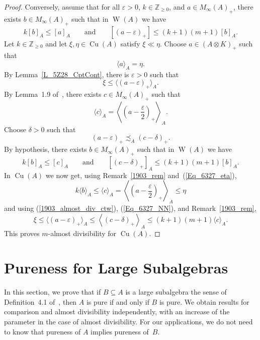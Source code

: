 \documentclass[10pt]{amsart}
\numberwithin{equation}{section}
\theoremstyle{definition}
\newcommand{\ep}{\varepsilon}
\newcommand{\Nz}{{\mathbb{Z}}_{\geq 0}}
\newcommand{\Cu}{{\operatorname{Cu}}}
\newcommand{\W}{{\operatorname{W}}}
\newcommand{\andeqn}{\qquad {\mbox{and}} \qquad}
\newcommand{\ifo}{if and only if}
\renewcommand{\S}{\subseteq}
\newcommand{\cc}[1]{\langle #1 \rangle}
\newcommand{\inn}[1]{\left\langle #1 \right\rangle}
\begin{document}
\begin{proof}
Conversely, assume that for all $\ep > 0$,
$k \in \Nz$, and $a \in M_{\infty}(A)_+$,
there exists $b \in M_{\infty}(A)_+$ such that in $\W (A)$ we have
\[
k[b]_A \leq [a]_A
\andeqn
[(a - \ep)_+] \leq (k + 1) (m + 1) [b]_A.
\]
Let $k \in \Nz$ and let $\xi, \eta \in \Cu (A)$ satisfy $\xi \ll \eta$.
Choose $a \in (A \otimes K)_+$ such that
%
\begin{equation}\label{Eq_6327_eta}
\cc{a}_A = \eta.
\end{equation}
%
By Lemma~\ref{L_5Z28_CptCont}, there is $\ep > 0$ such that
%
\begin{equation}\label{1903_almost_div_ctw}
\xi \leq \cc{(a - \ep)_+}_A.
\end{equation}
%
By Lemma~1.9 of~\cite{Phl40},
there exists $ c\in M_{\infty}(A)_+$ such that
\begin{equation*}
\cc{c}_A = \inn{\left(a - \frac{\ep}{2} \right)_+}_A.
\end{equation*}
Choose $\delta > 0$ such that
%
\begin{equation}\label{Eq_6327_NN}
\left(a - \ep\right)_+ \precsim_A (c- \delta)_+.
\end{equation}
%
By hypothesis, there exists $b \in M_{\infty}(A)_+$ such that
in $\W (A)$ we have
\[
k[b]_A \leq [c]_A
\andeqn
\left[\left(c- \delta\right)_+\right]_A \leq (k + 1) (m + 1) [b]_A.
\]
In $\Cu (A)$ we now get,
using Remark~\ref{1903_rem} and~(\ref{Eq_6327_eta}),
%
\begin{equation*}
k \cc{b}_A \leq \cc{c}_A
 = \inn{\left(a - \frac{\ep}{2} \right)_+}_A \leq \eta
\end{equation*}
%
and using (\ref{1903_almost_div_ctw}), (\ref{Eq_6327_NN}),
and Remark~\ref{1903_rem},
%
\begin{equation*}
\xi \leq \cc{(a - \ep)_+}_A
 \leq  \inn{\left(c- \delta\right)_+}_A \leq (k + 1) (m + 1) \cc{c}_A.
\end{equation*}
%
This proves $m$-almost divisibility for $\Cu (A)$.
\end{proof}

\section{Pureness for Large Subalgebras}\label{Sec_6314_PLarge}

In this section, we prove that if $B \S A$ is a large subalgebra
the sense of Definition~4.1 of~\cite{Phl40},
then $A$ is pure \ifo{} $B$ is pure.
We obtain results for comparison and almost divisibility
independently, with an increase of the parameter in the case
of almost divisibility.
For our applications, we do not need to know that pureness of $A$
implies pureness of~$B$.
\end{document}
